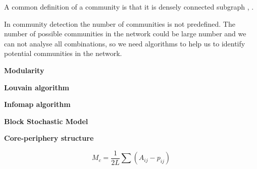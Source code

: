 A common definition of a community is that it is densely connected subgraph \cite{userguide}, \cite{martin}. 

In community detection the number of communities is not predefined. The number of possible communities in the network could be large number and we can not analyse all combinations, so we need algorithms to help us to identify potential communities in the network. 

\textbf{Modularity}

\textbf{Louvain algorithm}

\textbf{Infomap algorithm}

\textbf{Block Stochastic Model}

\textbf{Core-periphery structure}





$$M_c = \frac{1}{2L}\sum(A_{ij}-p_{ij})$$

